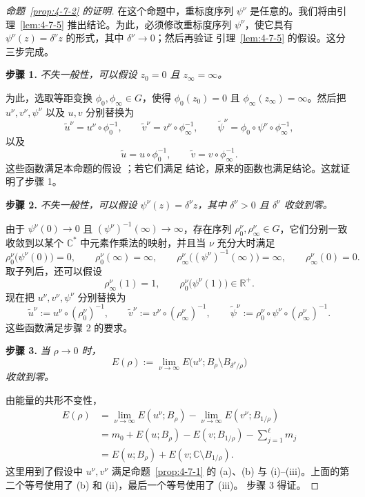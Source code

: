 \begin{proof}[命题~\ref{prop:4-7-2} 的证明]
在这个命题中，重标度序列 $\psi^\nu$ 是任意的。我们将由引理~\ref{lem:4-7-5}
推出结论。为此，必须修改重标度序列 $\psi^\nu$，使它具有
$\psi^\nu(z)=\delta^\nu z$ 的形式，其中 $\delta^\nu\to0$；然后再验证
引理~\ref{lem:4-7-5} 的假设。这分三步完成。

\medskip
\noindent\textbf{步骤 1.}\quad
\emph{不失一般性，可以假设 $z_0=0$ 且 $z_\infty=\infty$。}

为此，选取等距变换 $\phi_0,\phi_\infty\in G$，使得
$\phi_0(z_0)=0$ 且 $\phi_\infty(z_\infty)=\infty$。然后把
$u^\nu,v^\nu,\psi^\nu$ 以及 $u,v$ 分别替换为
\[
  \widetilde u^\nu=u^\nu\circ\phi_0^{-1},
  \qquad
  \widetilde v^\nu=v^\nu\circ\phi_\infty^{-1},
  \qquad
  \widetilde\psi^\nu
  =\phi_0\circ\psi^\nu\circ\phi_\infty^{-1},
\]
以及
\[
  \widetilde u=u\circ\phi_0^{-1},
  \qquad
  \widetilde v=v\circ\phi_\infty^{-1}.
\]
这些函数满足本命题的假设
；若它们满足
结论，原来的函数也满足结论。这就证明了步骤 1。

\medskip
\noindent\textbf{步骤 2.}\quad
\emph{不失一般性，可以假设 $\psi^\nu(z)=\delta^\nu z$，其中
$\delta^\nu>0$ 且 $\delta^\nu$ 收敛到零。}

由于 $\psi^\nu(0)\to0$ 且 $(\psi^\nu)^{-1}(\infty)\to\infty$，存在序列
$\rho_0^\nu,\rho_\infty^\nu\in G$，它们分别一致收敛到以某个
$\mathbb C^*$ 中元素作乘法的映射，并且当 $\nu$ 充分大时满足
\[
  \rho_0^\nu\bigl(\psi^\nu(0)\bigr)=0,
  \qquad \rho_0^\nu(\infty)=\infty,
  \qquad
  \rho_\infty^\nu\bigl((\psi^\nu)^{-1}(\infty)\bigr)=\infty,
  \qquad \rho_\infty^\nu(0)=0.
\]
取子列后，还可以假设
\[
  \rho_\infty^\nu(1)=1,
  \qquad
  \rho_0^\nu\bigl(\psi^\nu(1)\bigr)\in\mathbb R^+.
\]
现在把 $u^\nu,v^\nu,\psi^\nu$ 分别替换为
\[
  \widetilde u^\nu:=u^\nu\circ(\rho_0^\nu)^{-1},
  \qquad
  \widetilde v^\nu:=v^\nu\circ(\rho_\infty^\nu)^{-1},
  \qquad
  \widetilde\psi^\nu
  :=\rho_0^\nu\circ\psi^\nu\circ(\rho_\infty^\nu)^{-1}.
\]
这些函数满足步骤 2 的要求。

\medskip
\noindent\textbf{步骤 3.}\quad
\emph{当 $\rho\to0$ 时，
\[
  E(\rho):=\lim_{\nu\to\infty}
  E\bigl(u^\nu;B_\rho\setminus B_{\delta^\nu/\rho}\bigr)
\]
收敛到零。}

由能量的共形不变性，
\[
  \begin{aligned}
  E(\rho)
  &=\lim_{\nu\to\infty}E(u^\nu;B_\rho)
    -\lim_{\nu\to\infty}E(v^\nu;B_{1/\rho})\\
  &=m_0+E(u;B_\rho)-E(v;B_{1/\rho})
    -\sum_{j=1}^{\ell}m_j\\
  &=E(u;B_\rho)+E(v;\mathbb C\setminus B_{1/\rho}).
  \end{aligned}
\]
这里用到了假设中 $u^\nu,v^\nu$ 满足命题~\ref{prop:4-7-1} 的 (a)、(b) 与
(i)--(iii)。上面的第二个等号使用了 (b) 和 (ii)，最后一个等号使用了 (iii)。
步骤 3 得证。


\end{proof}
